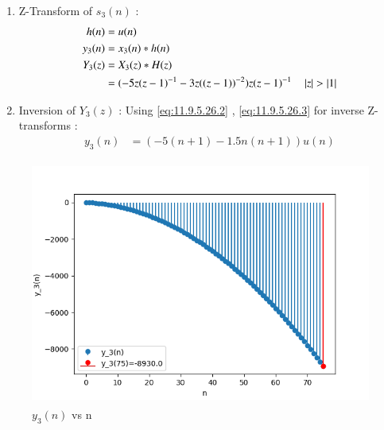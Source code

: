\documentclass[journal,12pt,onecolumn]{IEEEtran}
\theoremstyle{remark}
\begin{document}
\begin{enumerate}[(i)]
\begin{enumerate}[1.]
    \vspace{0.5cm}
\item
Z-Transform of $s_3(n)$ :
\begin{align}
         h(n) &= u(n) \\
    y_3(n) &= x_3(n) * h(n) \\
    Y_3(z) &= X_3(z) * H(z)\\
             &= (-5z(z-1)^{-1}-
       3z((z-1))^{-2})z(z-1)^{-1}
\quad \left\vert z\right\vert>\left\vert1\right\vert 
    \end{align}

    \item
Inversion of $Y_3(z)$ :
Using \eqref{eq:11.9.5.26.2} , \eqref{eq:11.9.5.26.3} for inverse Z-transforms :
\begin{align}
 y_3(n) &= (-5(n+1) - 1.5n(n+1))u(n)   
\end{align}
    \end{enumerate}



\begin{figure}[!ht]   
\centering
\graphicspath{ {figs/} }
\includegraphics[width=12cm, height=8cm]{graph_3}
\caption{$y_3(n)$ vs n }\label{graph:ee25-g4}
\end{figure}
 \end{enumerate}
\end{document}
